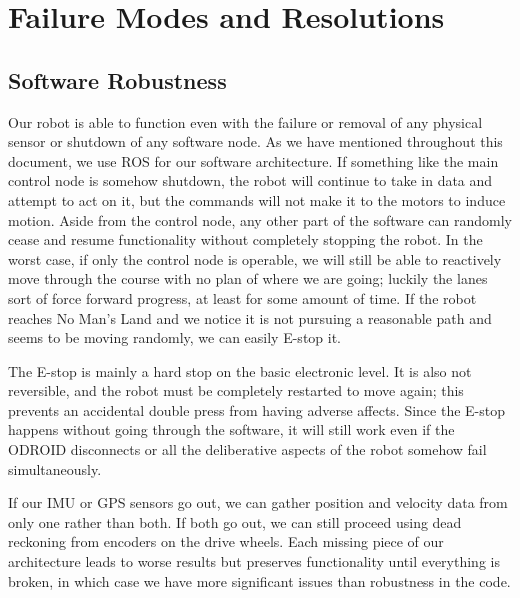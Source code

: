 \section{Failure Modes and Resolutions}

\subsection{Software Robustness}

Our robot is able to function even with the failure or removal of any physical sensor or shutdown of any software node. As we have mentioned throughout this document, we use ROS for our software architecture. If something like the main control node is somehow shutdown, the robot will continue to take in data and attempt to act on it, but the commands will not make it to the motors to induce motion. Aside from the control node, any other part of the software can randomly cease and resume functionality without completely stopping the robot. In the worst case, if only the control node is operable, we will still be able to reactively move through the course with no plan of where we are going; luckily the lanes sort of force forward progress, at least for some amount of time. If the robot reaches No Man's Land and we notice it is not pursuing a reasonable path and seems to be moving randomly, we can easily E-stop it.

The E-stop is mainly a hard stop on the basic electronic level. It is also not reversible, and the robot must be completely restarted to move again; this prevents an accidental double press from having adverse affects. Since the E-stop happens without going through the software, it will still work even if the ODROID disconnects or all the deliberative aspects of the robot somehow fail simultaneously.


If our IMU or GPS sensors go out, we can gather position and velocity data from only one rather than both. If both go out, we can still proceed using dead reckoning from encoders on the drive wheels. Each missing piece of our architecture leads to worse results but preserves functionality until everything is broken, in which case we have more significant issues than robustness in the code. 

